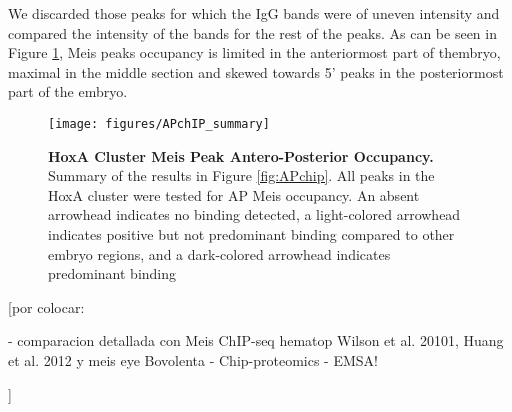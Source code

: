 We discarded those peaks for which the IgG bands were of uneven intensity and compared the intensity of the bands for the rest of the peaks. As can be seen in Figure \ref{fig:APchipSummary}, Meis peaks occupancy is limited in the anteriormost part of thembryo, maximal in the middle section and skewed towards 5' peaks in the posteriormost part of the embryo.

\begin{figure}[]
  \centering
  \texttt{[image: figures/APchIP\_summary]}
  \caption[HoxA Cluster Meis Peak Antero-Posterior Occupancy]{\textbf{HoxA Cluster Meis Peak Antero-Posterior Occupancy.} Summary of the results in Figure \ref{fig:APchip}. All peaks in the HoxA cluster were tested for AP Meis occupancy. An absent arrowhead indicates no binding detected, a light-colored arrowhead indicates positive but not predominant binding compared to other embryo regions, and a dark-colored arrowhead indicates predominant binding}
  \label{fig:APchipSummary}
\end{figure}

[por colocar:

- comparacion detallada con Meis ChIP-seq hematop {Wilson et al. 20101, Huang et al. 2012} y meis eye {Bovolenta}
- Chip-proteomics
- EMSA!

]
